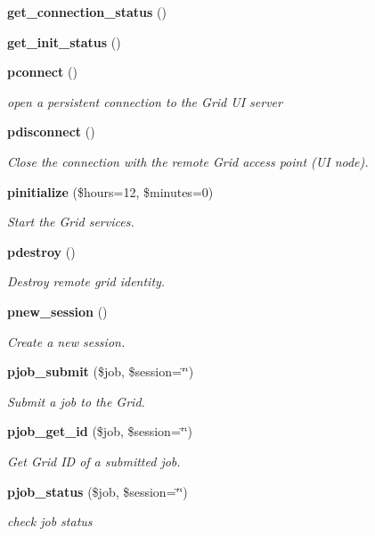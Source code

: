 \begin{CompactItemize}
{\bf get\_\-connection\_\-status} ()
\item 
{\bf get\_\-init\_\-status} ()
\item 
{\bf pconnect} ()
\begin{CompactList}\small\item\em open a persistent connection to the Grid UI server \item\end{CompactList}\item 
{\bf pdisconnect} ()
\begin{CompactList}\small\item\em Close the connection with the remote Grid access point (UI node). \item\end{CompactList}\item 
{\bf pinitialize} (\$hours=12, \$minutes=0)
\begin{CompactList}\small\item\em Start the Grid services. \item\end{CompactList}\item 
{\bf pdestroy} ()
\begin{CompactList}\small\item\em Destroy remote grid identity. \item\end{CompactList}\item 
{\bf pnew\_\-session} ()
\begin{CompactList}\small\item\em Create a new session. \item\end{CompactList}\item 
{\bf pjob\_\-submit} (\$job, \$session=\char`\"{}\char`\"{})
\begin{CompactList}\small\item\em Submit a job to the Grid. \item\end{CompactList}\item 
{\bf pjob\_\-get\_\-id} (\$job, \$session=\char`\"{}\char`\"{})
\begin{CompactList}\small\item\em Get Grid ID of a submitted job. \item\end{CompactList}\item 
{\bf pjob\_\-status} (\$job, \$session=\char`\"{}\char`\"{})
\begin{CompactList}\small\item\em check job status \item\end{CompactList}\item 

\end{CompactItemize}
